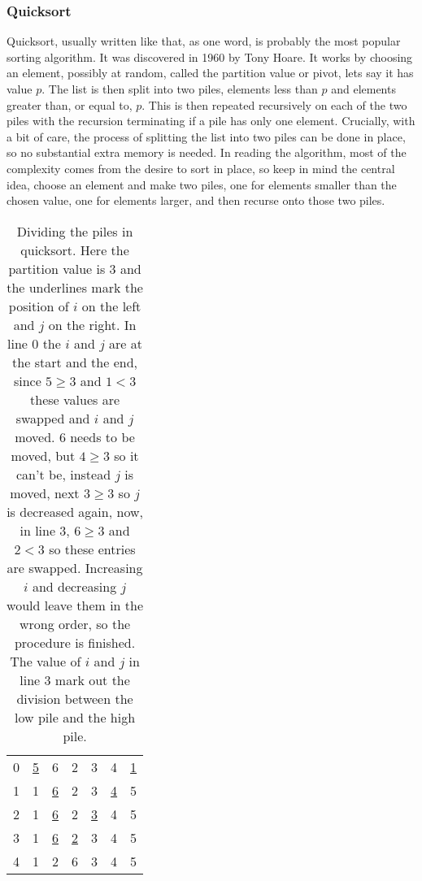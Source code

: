 \documentclass[11pt,a4paper]{scrartcl}
\begin{document}
\subsubsection*{Quicksort}

Quicksort, usually written like that, as one word, is probably the
most popular sorting algorithm. It was discovered in 1960 by Tony
Hoare. It works by choosing an element, possibly at random, called the
partition value or pivot, lets say it has value $p$. The list is then
split into two piles, elements less than $p$ and elements greater
than, or equal to, $p$. This is then repeated recursively on each of
the two piles with the recursion terminating if a pile has only one
element. Crucially, with a bit of care, the process of splitting the
list into two piles can be done in place, so no substantial extra
memory is needed. In reading the algorithm, most of the complexity
comes from the desire to sort in place, so keep in mind the central
idea, choose an element and make two piles, one for elements smaller
than the chosen value, one for elements larger, and then recurse onto
those two piles.

\begin{table}
\begin{tabular}{c|cccccc}
0&\underline{5}&6&2&3&4&\underline{1}\\
1&1&\underline{6}&2&3&\underline{4}&5\\
2&1&\underline{6}&2&\underline{3}&4&5\\
3&1&\underline{6}&\underline{2}&3&4&5\\
4&1&2&6&3&4&5\\
\end{tabular}
\caption{Dividing the piles in quicksort. Here the partition value is
  3 and the underlines mark the position of $i$ on the left and $j$ on
  the right. In line 0 the $i$ and $j$ are at the start and the end,
  since $5\ge 3$ and $1<3$ these values are swapped and $i$ and $j$
  moved. 6 needs to be moved, but $4\ge 3$ so it can't be, instead $j$
  is moved, next $3\ge 3$ so $j$ is decreased again, now, in line 3,
  $6\ge 3$ and $2<3$ so these entries are swapped. Increasing $i$ and
  decreasing $j$ would leave them in the wrong order, so the procedure
  is finished. The value of $i$ and $j$ in line 3 mark out the
  division between the low pile and the high
  pile.\label{table_quick_divide}}
\end{table}
\end{document}
